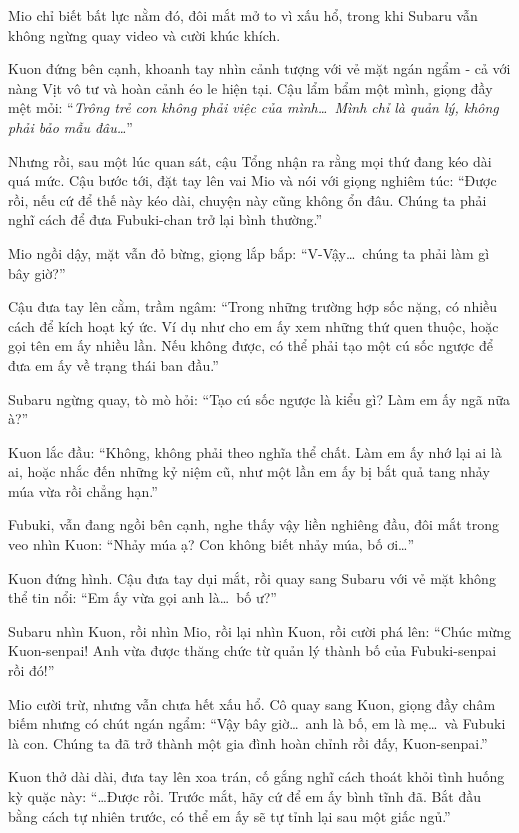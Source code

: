 \documentclass[../main.tex]{subfiles}
\begin{document}
Mio chỉ biết bất lực nằm đó, đôi mắt mở to vì xấu hổ, trong khi Subaru vẫn không ngừng quay video và cười khúc khích.

Kuon đứng bên cạnh, khoanh tay nhìn cảnh tượng với vẻ mặt ngán ngẩm - cả với nàng Vịt vô tư và hoàn cảnh éo le hiện tại. Cậu lẩm bẩm một mình, giọng đầy mệt mỏi: ``\textit{Trông trẻ con không phải việc của mình\dots\ Mình chỉ là quản lý, không phải bảo mẫu đâu\dots}''

Nhưng rồi, sau một lúc quan sát, cậu Tổng nhận ra rằng mọi thứ đang kéo dài quá mức. Cậu bước tới, đặt tay lên vai Mio và nói với giọng nghiêm túc: ``Được rồi, nếu cứ để thế này kéo dài, chuyện này cũng không ổn đâu. Chúng ta phải nghĩ cách để đưa Fubuki-chan trở lại bình thường.''

Mio ngồi dậy, mặt vẫn đỏ bừng, giọng lắp bắp: ``V-Vậy\dots\ chúng ta phải làm gì bây giờ?''

Cậu đưa tay lên cằm, trầm ngâm: ``Trong những trường hợp sốc nặng, có nhiều cách để kích hoạt ký ức. Ví dụ như cho em ấy xem những thứ quen thuộc, hoặc gọi tên em ấy nhiều lần. Nếu không được, có thể phải tạo một cú sốc ngược để đưa em ấy về trạng thái ban đầu.''

Subaru ngừng quay, tò mò hỏi: ``Tạo cú sốc ngược là kiểu gì? Làm em ấy ngã nữa à?''

Kuon lắc đầu: ``Không, không phải theo nghĩa thể chất. Làm em ấy nhớ lại ai là ai, hoặc nhắc đến những kỷ niệm cũ, như một lần em ấy bị bắt quả tang nhảy múa vừa rồi chẳng hạn.''

Fubuki, vẫn đang ngồi bên cạnh, nghe thấy vậy liền nghiêng đầu, đôi mắt trong veo nhìn Kuon: ``Nhảy múa ạ? Con không biết nhảy múa, bố ơi\dots''

Kuon đứng hình. Cậu đưa tay dụi mắt, rồi quay sang Subaru với vẻ mặt không thể tin nổi: ``Em ấy vừa gọi anh là\dots\ bố ư?''

Subaru nhìn Kuon, rồi nhìn Mio, rồi lại nhìn Kuon, rồi cười phá lên: ``Chúc mừng Kuon-senpai! Anh vừa được thăng chức từ quản lý thành bố của Fubuki-senpai rồi đó!''

Mio cười trừ, nhưng vẫn chưa hết xấu hổ. Cô quay sang Kuon, giọng đầy châm biếm nhưng có chút ngán ngẩm: ``Vậy bây giờ\dots\ anh là bố, em là mẹ\dots\ và Fubuki là con. Chúng ta đã trở thành một gia đình hoàn chỉnh rồi đấy, Kuon-senpai.''

Kuon thở dài dài, đưa tay lên xoa trán, cố gắng nghĩ cách thoát khỏi tình huống kỳ quặc này: ``\dots Được rồi. Trước mắt, hãy cứ để em ấy bình tĩnh đã. Bắt đầu bằng cách tự nhiên trước, có thể em ấy sẽ tự tỉnh lại sau một giấc ngủ.''
\end{document}
